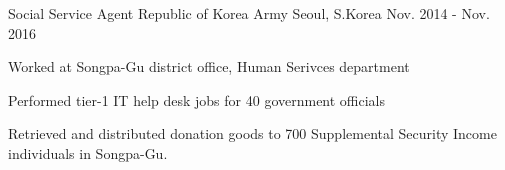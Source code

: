 

\begin{cventries}

  \cventry
    {Social Service Agent} %
    {Republic of Korea Army} %
    {Seoul, S.Korea} %
    {Nov. 2014 - Nov. 2016} %
    {
      \begin{cvitems} %
        \item {Worked at Songpa-Gu district office, Human Serivces department}
        \item {Performed tier-1 IT help desk jobs for 40 government officials}
        \item {Retrieved and distributed donation goods to 700 Supplemental Security Income individuals in Songpa-Gu.}
      \end{cvitems}
    }

\end{cventries}

